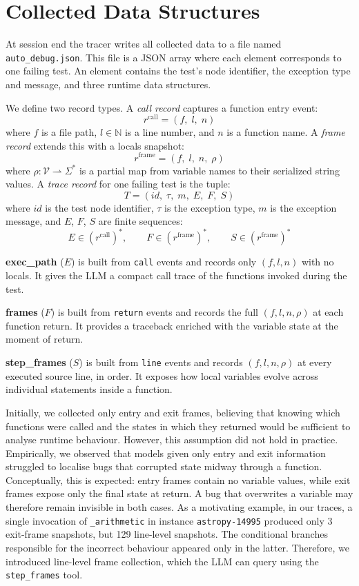 \section{Collected Data Structures}
\label{sec:data-structures}

At session end the tracer writes all collected data to a file named \texttt{auto\_debug.json}. This file is a JSON array where each element corresponds to one failing test. An element contains the test's node identifier, the exception type and message, and three runtime data structures.

We define two record types. A \emph{call record} captures a function entry event:
\[
  r^{\mathrm{call}} = (f,\; l,\; n)
\]
where $f$ is a file path, $l \in \mathbb{N}$ is a line number, and $n$ is a function name. A \emph{frame record} extends this with a locals snapshot:
\[
  r^{\mathrm{frame}} = (f,\; l,\; n,\; \rho)
\]
where $\rho : \mathcal{V} \rightharpoonup \Sigma^{*}$ is a partial map from variable names to their serialized string values. A \emph{trace record} for one failing test is the tuple:
\[
  T = (\mathit{id},\; \tau,\; m,\; E,\; F,\; S)
\]
where $\mathit{id}$ is the test node identifier, $\tau$ is the exception type, $m$ is the exception message, and $E$, $F$, $S$ are finite sequences:
\[
  E \in (r^{\mathrm{call}})^{*}, \qquad F \in (r^{\mathrm{frame}})^{*}, \qquad S \in (r^{\mathrm{frame}})^{*}
\]

\textbf{exec\_path} ($E$) is built from \texttt{call} events and records only $(f, l, n)$ with no locals. It gives the LLM a compact call trace of the functions invoked during the test.

\textbf{frames} ($F$) is built from \texttt{return} events and records the full $(f, l, n, \rho)$ at each function return. It provides a traceback enriched with the variable state at the moment of return.

\textbf{step\_frames} ($S$) is built from \texttt{line} events and records $(f, l, n, \rho)$ at every executed source line, in order. It exposes how local variables evolve across individual statements inside a function.

Initially, we collected only entry and exit frames, believing that knowing which functions were called and the states in which they returned would be sufficient to analyse runtime behaviour. However, this assumption did not hold in practice. Empirically, we observed that models given only entry and exit information struggled to localise bugs that corrupted state midway through a function. Conceptually, this is expected: entry frames contain no variable values, while exit frames expose only the final state at return. A bug that overwrites a variable may therefore remain invisible in both cases. As a motivating example, in our traces, a single invocation of \texttt{\_arithmetic} in instance \texttt{astropy-14995} produced only 3 exit-frame snapshots, but 129 line-level snapshots. The conditional branches responsible for the incorrect behaviour appeared only in the latter. Therefore, we introduced line-level frame collection, which the LLM can query using the \texttt{step\_frames} tool.

